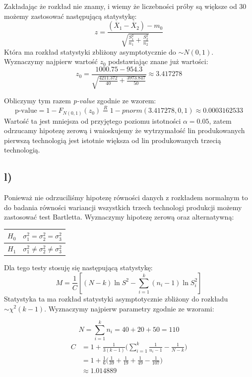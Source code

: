 \documentclass{article}
\begin{document}
Zakładając że rozkład nie znamy, i wiemy że liczebności próby są większe od 30 możemy zastosować następującą statystykę:
\[ z = \frac{(\overline{X}_1 - \overline{X}_2) - m_0}{ \sqrt{\frac{S_1^2}{n_1} + \frac{S_2^2}{n_2}} } \]
Która ma rozkład statystyki zbliżony asymptotycznie do $\sim N(0,1)$. \\
Wyznaczymy najpierw wartość $z_0$ podstawiając znane już wartości:
\[ z_0 =  \frac{ 1000.75 - 954.3}{ \sqrt{\frac{4211.372}{40} + \frac{3973.847}{50}} } \approx 3.417278 \]

Obliczymy tym razem \textit{p-value} zgodnie ze wzorem:
\[ \text{p-value} = 1 - F_{N(0,1)}(z_0) \overset{R}{=} 1 - pnorm(3.417278, 0, 1) \approx 0.0003162533 \]
Wartość ta jest mniejsza od przyjętego poziomu istotności $\alpha = 0.05$, zatem odrzucamy hipotezę zerową i wnioskujemy że wytrzymałość lin produkowanych pierwszą technologią jest istotnie większa od lin produkowanych trzecią technologią.

\subsection{l)}
Ponieważ nie odrzuciliśmy hipotezę równości danych z rozkładem normalnym to do badania równości wariancji wszystkich trzech technologi produkcji możemy zastosować test Bartletta. Wyznaczymy hipotezę zerową oraz alternatywną:
\begin{center} \begin{tabular}{|c|c|} \hline
$H_0$ & $\sigma_1^2 = \sigma_2^2 = \sigma_3^2$ \\ \hline
$H_1$ & $\sigma_1^2 \neq \sigma_2^2 \neq \sigma_3^2$ \\ \hline
\end{tabular} \end{center}

Dla tego testy stosuję się następującą statystykę:
\[ M = \frac{1}{C} \left[ (N-k)\ln{S^2} - \sum_{i=1}^k (n_i-1)\ln{S_i^2} \right] \]
Statystyka ta ma rozkład statystyki asymptotycznie zbliżony do rozkładu $\sim \chi^2(k-1)$. Wyznaczymy najpierw parametry zgodnie ze wzorami:

\[ N = \sum_{i=1}^k n_i = 40 + 20 + 50 = 110 \]
\begin{align*}
C & = 1 + \frac{1}{3(k-1)} \big( \sum_{i=1}^k \frac{1}{n_i-1} - \frac{1}{N-k} \big) \\
& = 1 + \frac{1}{6} \big(\frac{1}{39} + \frac{1}{19} + \frac{1}{49} - \frac{1}{107}\big) \\
& \approx 1.014889
\end{align*}
\end{document}
